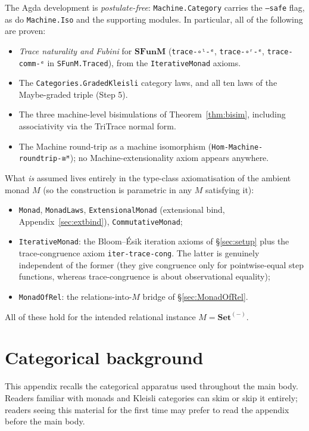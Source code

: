 \documentclass[11pt]{article}
\newcommand{\Set}{\mathbf{Set}}
\newcommand{\SFunM}{\mathbf{SFunM}}
\begin{document}
The Agda development is \emph{postulate-free}:
\texttt{Machine.Category} carries the \texttt{--safe} flag, as do
\texttt{Machine.Iso} and the supporting modules.  In particular, all
of the following are proven:
\begin{itemize}
  \item \emph{Trace naturality and Fubini} for $\SFunM$
        (\texttt{trace-∘ˡ-ᵉ}, \texttt{trace-∘ʳ-ᵉ},
        \texttt{trace-comm-ᵉ} in \texttt{SFunM.Traced}), from the
        \texttt{IterativeMonad} axioms.
  \item The \texttt{Categories.GradedKleisli} category laws, and all
        ten laws of the Maybe-graded triple (Step 5).
  \item The three machine-level bisimulations of
        Theorem~\ref{thm:bisim}, including associativity via the
        TriTrace normal form.
  \item The Machine round-trip as a machine isomorphism
        (\texttt{Hom-Machine-roundtrip-≅ᴹ}); no Machine-extensionality
        axiom appears anywhere.
\end{itemize}

What \emph{is} assumed lives entirely in the type-class
axiomatisation of the ambient monad $M$ (so the construction is
parametric in any $M$ satisfying it):
\begin{itemize}
  \item \texttt{Monad}, \texttt{MonadLaws},
        \texttt{ExtensionalMonad} (extensional bind,
        Appendix~\ref{sec:extbind}), \texttt{CommutativeMonad};
  \item \texttt{IterativeMonad}: the Bloom--\'Esik iteration axioms
        of \S\ref{sec:setup} plus the trace-congruence axiom
        \texttt{iter-trace-cong}.  The latter is genuinely
        independent of the former (they give congruence only for
        pointwise-equal step functions, whereas trace-congruence is
        about observational equality);
  \item \texttt{MonadOfRel}: the relations-into-$M$ bridge of
        \S\ref{sec:MonadOfRel}.
\end{itemize}
All of these hold for the intended relational instance
$M = \Set^{(-)}$.

\appendix

\section{Categorical background}
\label{sec:background}

This appendix recalls the categorical apparatus used throughout the
main body.  Readers familiar with monads and Kleisli categories can
skim or skip it entirely; readers seeing this material for the first
time may prefer to read the appendix before the main body.
\end{document}
